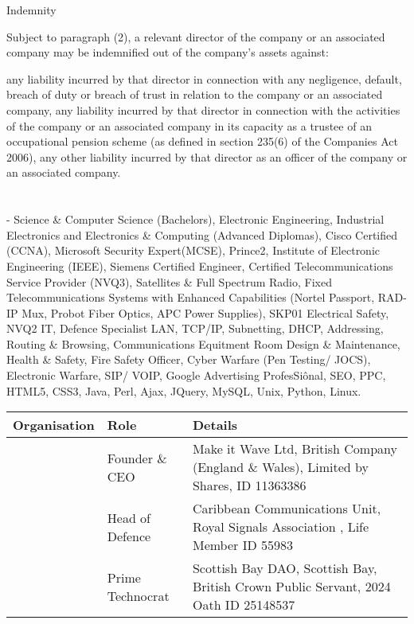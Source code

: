 \documentclass[letterpaper,10pt,english]{sphinxmanual}
\begin{document}
Indemnity

Subject to paragraph (2), a relevant director of the company or an associated company may be indemnified out of the company’s assets against:

any liability incurred by that director in connection with any negligence, default, breach of duty or breach of trust in relation to the company or an associated company,
any liability incurred by that director in connection with the activities of the company or an associated company in its capacity as a trustee of an occupational pension scheme (as defined in section 235(6) of the Companies Act 2006),
any other liability incurred by that director as an officer of the company or an associated company.


\chapter{}
\label{\detokenize{index:document-author-s}}
 - Science \& Computer Science (Bachelors), Electronic Engineering, Industrial Electronics and Electronics \& Computing (Advanced Diplomas), Cisco Certified (CCNA), Microsoft Security Expert(MCSE), Prince2, Institute of Electronic Engineering (IEEE), Siemens Certified Engineer, Certified Telecommunications Service Provider (NVQ3), Satellites \& Full Spectrum Radio, Fixed Telecommunications Systems with Enhanced Capabilities (Nortel Passport, RAD-IP Mux, Probot Fiber Optics, APC Power Supplies), SKP01 Electrical Safety, NVQ2 IT, Defence Specialist LAN, TCP/IP, Subnetting, DHCP, Addressing, Routing \& Browsing, Communications Equitment Room Design \& Maintenance, Health \& Safety, Fire Safety Officer, Cyber Warfare (Pen Testing/ JOCS), Electronic Warfare, SIP/ VOIP, Google Advertising ProfesSiônal, SEO, PPC, HTML5, CSS3, Java, Perl, Ajax, JQuery, MySQL, Unix, Python, Linux.


\begin{savenotes}\sphinxattablestart
\centering
\begin{tabulary}{\linewidth}[t]{|T|T|T|}
\hline
\sphinxstyletheadfamily 
Organisation
&\sphinxstyletheadfamily 
Role
&\sphinxstyletheadfamily 
Details
\\
\hline
\noindent{}
&
Founder \& CEO
&
Make it Wave Ltd, British Company (England \& Wales), Limited by Shares, ID 11363386
\\
\hline
\noindent{}
&
Head of Defence
&
Caribbean Communications Unit, Royal Signals Association , Life Member ID 55983
\\
\hline
\noindent{}
&
Prime Technocrat
&
Scottish Bay DAO, Scottish Bay, British Crown Public Servant, 2024 Oath ID 25148537
\\
\hline
\end{tabulary}
\par
\sphinxattableend\end{savenotes}



\renewcommand{\indexname}{Index}
\printindex
\end{document}
